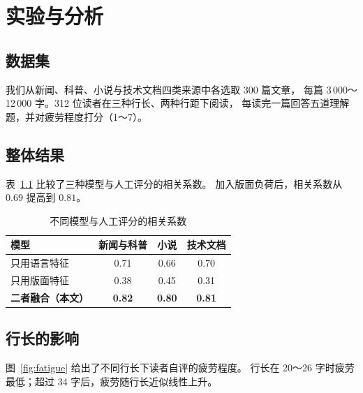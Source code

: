 \chapter{实验与分析}
\label{chap:experiment}

\section{数据集}

我们从新闻、科普、小说与技术文档四类来源中各选取 300 篇文章，
每篇 3\,000～12\,000 字。312 位读者在三种行长、两种行距下阅读，
每读完一篇回答五道理解题，并对疲劳程度打分（1～7）。

\section{整体结果}

表~\ref{tab:main} 比较了三种模型与人工评分的相关系数。
加入版面负荷后，相关系数从 $0.69$ 提高到 $0.81$。

\begin{table}[htbp]
  \centering
  \caption{不同模型与人工评分的相关系数}
  \label{tab:main}
  \begin{tabular}{@{}l c c c@{}}
    \toprule
    模型 & 新闻与科普 & 小说 & 技术文档 \\
    \midrule
    只用语言特征 & 0.71 & 0.66 & 0.70 \\
    只用版面特征 & 0.38 & 0.45 & 0.31 \\
    \textbf{二者融合（本文）} & \textbf{0.82} & \textbf{0.80} & \textbf{0.81} \\
    \bottomrule
  \end{tabular}
\end{table}

\section{行长的影响}

图~\ref{fig:fatigue} 给出了不同行长下读者自评的疲劳程度。
行长在 20～26 字时疲劳最低；超过 34 字后，疲劳随行长近似线性上升。

